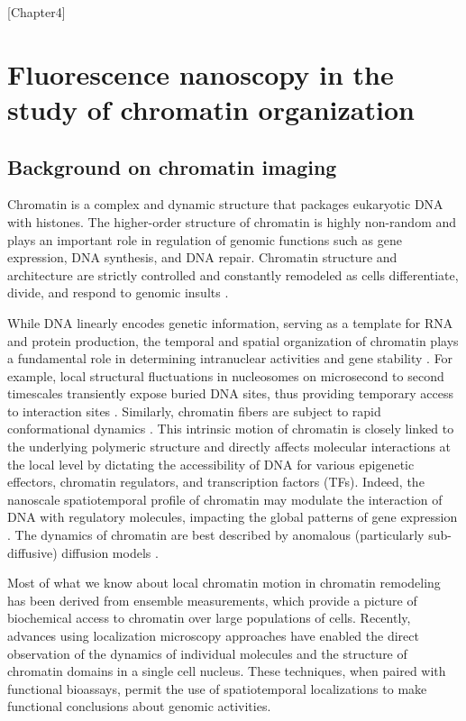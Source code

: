 [Chapter4]

\chapter{Fluorescence nanoscopy in the study of chromatin organization}

\section{Background on chromatin imaging}

Chromatin is a complex and dynamic structure that packages eukaryotic DNA with histones. The higher-order structure of chromatin is highly non-random and plays an important role in regulation of genomic functions such as gene expression, DNA synthesis, and DNA repair. Chromatin structure and architecture are strictly controlled and constantly remodeled as cells differentiate, divide, and respond to genomic insults \parencite{Auerbach2009,Chien2009,Clapier2009,Misteli2007,Vidi2014}.

While DNA linearly encodes genetic information, serving as a template for RNA and protein production, the temporal and spatial organization of chromatin plays a fundamental role in determining intranuclear activities and gene stability \parencite{Cuvier2017,Dion2013}. For example, local structural fluctuations in nucleosomes on microsecond to second timescales transiently expose buried DNA sites, thus providing temporary access to interaction sites \parencite{Choy2012}. Similarly, chromatin fibers are subject to rapid conformational dynamics \parencite{Li2016}. This intrinsic motion of chromatin is closely linked to the underlying polymeric structure and directly affects molecular interactions at the local level by dictating the accessibility of DNA for various epigenetic effectors, chromatin regulators, and transcription factors (TFs). Indeed, the nanoscale spatiotemporal profile of chromatin may modulate the interaction of DNA with regulatory molecules, impacting the global patterns of gene expression \parencite{Bintu2018,Boettiger2016,Grant2018,Xu2018}. The dynamics of chromatin are best described by anomalous (particularly sub-diffusive) diffusion models \parencite{Fierz2019,Shukron2019}.

Most of what we know about local chromatin motion in chromatin remodeling has been derived from ensemble measurements, which provide a picture of biochemical access to chromatin over large populations of cells. Recently, advances using localization microscopy approaches have enabled the direct observation of the dynamics of individual molecules and the structure of chromatin domains in a single cell nucleus. These techniques, when paired with functional bioassays, permit the use of spatiotemporal localizations to make functional conclusions about genomic activities.

